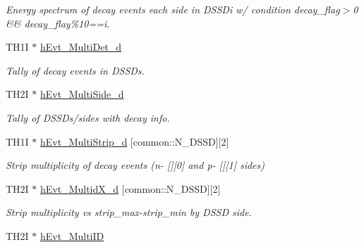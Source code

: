 \begin{DoxyCompactItemize}
\begin{DoxyCompactList}\small\item\em Energy spectrum of decay events each side in D\-S\-S\-Di w/ condition decay\-\_\-flag$>$0 \&\& decay\-\_\-flay\%10==i. \end{DoxyCompactList}\item 
\hypertarget{classAnalysis_aef9e8ef9363d46c49b7c6e85470ff4aa}{T\-H1\-I $\ast$ \hyperlink{classAnalysis_aef9e8ef9363d46c49b7c6e85470ff4aa}{h\-Evt\-\_\-\-Multi\-Det\-\_\-d}}\label{classAnalysis_aef9e8ef9363d46c49b7c6e85470ff4aa}

\begin{DoxyCompactList}\small\item\em Tally of decay events in D\-S\-S\-Ds. \end{DoxyCompactList}\item 
\hypertarget{classAnalysis_a87f1fdb8633686352ca96ba9ad518ce1}{T\-H2\-I $\ast$ \hyperlink{classAnalysis_a87f1fdb8633686352ca96ba9ad518ce1}{h\-Evt\-\_\-\-Multi\-Side\-\_\-d}}\label{classAnalysis_a87f1fdb8633686352ca96ba9ad518ce1}

\begin{DoxyCompactList}\small\item\em Tally of D\-S\-S\-Ds/sides with decay info. \end{DoxyCompactList}\item 
\hypertarget{classAnalysis_a02e0e75c22efc2d29146e085f03eb653}{T\-H1\-I $\ast$ \hyperlink{classAnalysis_a02e0e75c22efc2d29146e085f03eb653}{h\-Evt\-\_\-\-Multi\-Strip\-\_\-d} \mbox{[}common\-::\-N\-\_\-\-D\-S\-S\-D\mbox{]}\mbox{[}2\mbox{]}}\label{classAnalysis_a02e0e75c22efc2d29146e085f03eb653}

\begin{DoxyCompactList}\small\item\em Strip multiplicity of decay events (n-\/ \mbox{[}\mbox{]}\mbox{[}0\mbox{]} and p-\/ \mbox{[}\mbox{]}\mbox{[}1\mbox{]} sides) \end{DoxyCompactList}\item 
\hypertarget{classAnalysis_abee9f14aa189dee5fcbb74a5c4889308}{T\-H2\-I $\ast$ \hyperlink{classAnalysis_abee9f14aa189dee5fcbb74a5c4889308}{h\-Evt\-\_\-\-Multid\-X\-\_\-d} \mbox{[}common\-::\-N\-\_\-\-D\-S\-S\-D\mbox{]}\mbox{[}2\mbox{]}}\label{classAnalysis_abee9f14aa189dee5fcbb74a5c4889308}

\begin{DoxyCompactList}\small\item\em Strip multiplicity vs strip\-\_\-max-\/strip\-\_\-min by D\-S\-S\-D side. \end{DoxyCompactList}\item 
\hypertarget{classAnalysis_ad7a4124daef60d368e1abcaaf01a5f97}{T\-H2\-I $\ast$ \hyperlink{classAnalysis_ad7a4124daef60d368e1abcaaf01a5f97}{h\-Evt\-\_\-\-Multi\-I\-D}}\label{classAnalysis_ad7a4124daef60d368e1abcaaf01a5f97}


\end{DoxyCompactItemize}
